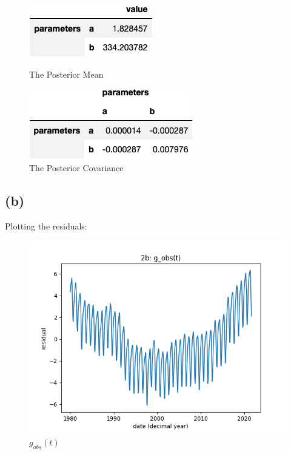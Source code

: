 \documentclass[12pt]{article}
\begin{document}
\begin{figure}[h]
\centering
\begin{minipage}{.5\textwidth}
  \centering
\includegraphics[scale = 0.5]{outputs/q2/a-mean}
\caption{The Posterior Mean}
\label{fig:fig2-a-mean}
\end{minipage}%
\begin{minipage}{.5\textwidth}
  \centering
\includegraphics[scale = 0.5]{outputs/q2/a-covariance}
\caption{The Posterior Covariance}
\label{fig:fig2-a-covariance}
\end{minipage}
\end{figure}

\subsection*{(b)}

Plotting the residuals:

\begin{figure}[h]
\centering
\includegraphics[scale=0.5]{outputs/q2/b-residuals-timeseries}
\caption{$g_{obs}(t)$}
\label{fig:b-residuals-timeseries}
\end{figure}
\end{document}
